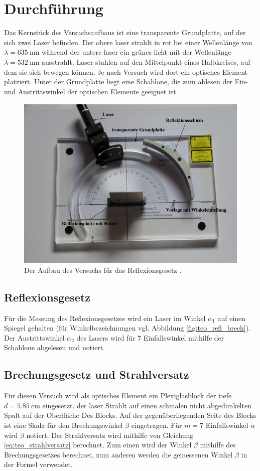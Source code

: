 \section{Durchführung}
Das Kernstück des Versuchsaufbaus ist eine transparente Grundplatte, auf der sich zwei Laser befinden. 
Der obere laser strahlt in rot bei einer Wellenlänge von $\lambda = \qty{635}{\nano\meter}$ während der
untere laser ein grünes licht mit der Wellenlänge $\lambda = \qty{532}{\nano\meter}$ ausstrahlt.
Laser stahlen auf den Mittelpunkt eines Halbkreises, auf dem sie sich bewegen können.
Je nach Versuch wird dort ein optisches Element platziert.
Unter der Grundplatte liegt eine Schablone, die zum ablesen der Ein- und Austrittswinkel der optischen
Elemente geeignet ist.
\begin{figure}
    \centering
    \includegraphics[width=\textwidth]{Abbildungen/Aufbau(for_real).png}
    \caption{Der Aufbau des Versuchs für das Reflexionsgesetz \cite{man:v400}.}
\end{figure}

\subsection{Reflexionsgesetz}
Für die Messung des Reflexionsgesetzes wird ein Laser im Winkel
$\alpha_1$ auf einen Spiegel gehalten (für Winkelbezeichnungen vgl. Abbildung \ref{fig:teo_refl_brech}).
Der Austrittswinkel $\alpha_2$ des Lasers wird für 7 Einfallswinkel mithilfe der Schablone abgelesen und notiert.

\subsection{Brechungsgesetz und Strahlversatz}
Für diesen Versuch wird als optisches Element ein Plexiglasblock der tiefe $d = \qty{5.85}{\cm}$ eingesetzt.
der laser Strahlt auf einen schmalen nicht abgedunkelten Spalt auf der Oberfläche Des Blocks.
Auf der gegenüberliegenden Seite des Blocks ist eine Skala für den Brechungswinkel $\beta$ eingetragen.
Für $m= 7$ Einfallswinkel $\alpha$ wird $\beta$ notiert.
Der Strahlversatz wird mithilfe von Gleichung \eqref{eq:teo_strahlversatz} berechnet.
Zum einen wird der Winkel $\beta$ mithilfe des Brechungsgesetzes berechnet,
zum anderen werden die gemessenen Winkel $\beta$ in der Formel verwendet.

